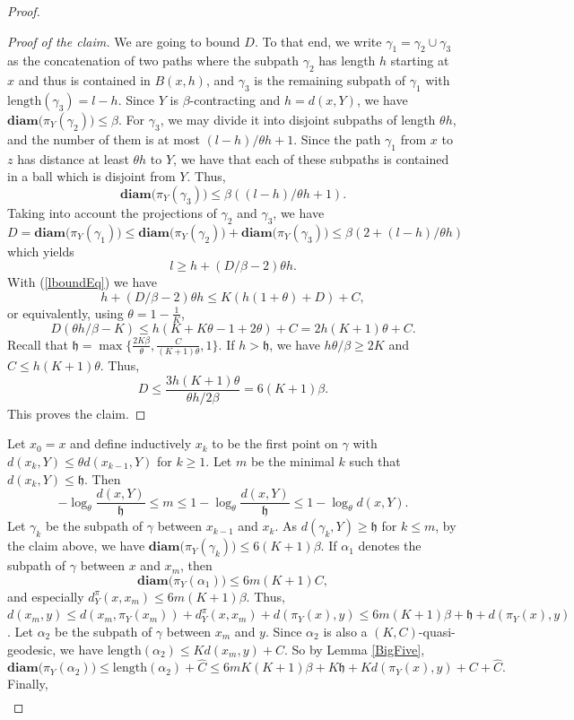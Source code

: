 \documentclass{amsart}
\numberwithin{thm}{section}
\numberwithin{figure}{section}
\theoremstyle{definition}
\theoremstyle{definition}
\theoremstyle{remark}
\newcommand{\diam }[1]{{\textbf{diam}\big(#1\big)}}
\numberwithin{equation}{section}
\theoremstyle{plain}
\begin{document}
\begin{proof}
\begin{proof}[Proof of the claim]
		We are going to bound $D$. To that end,  we write $\gamma_1 = \gamma_2 \cup \gamma_3$ as the concatenation of two paths where  the subpath $\gamma_2$ has length $h$ starting at $x$ and thus is contained in $B(x, h)$, and $\gamma_3$ is the remaining subpath of $\gamma_1$ with $\mathrm{length}(\gamma_3) = l - h$. Since $Y$ is $\beta$-contracting and $h = d(x, Y)$, we have $\diam{\pi_Y(\gamma_2)} \le \beta$. For $\gamma_3$, we may divide it into disjoint subpaths of length $\theta h$, and the number of them is at most $({l-h})/{\theta h} + 1.$ Since the path $\gamma_1$ from $x$ to $z$ has distance at least $\theta h$ to $Y$, we have that each of these subpaths is contained in a ball which is disjoint from $Y$. Thus, $$\diam{\pi_Y(\gamma_3)}\le \beta\left({(l-h)}/{\theta h} + 1\right).$$ Taking into account the projections  of $\gamma_2$ and $\gamma_3$, we have $$D = \diam{\pi_Y(\gamma_1)} \le \diam{\pi_Y(\gamma_2)} + \diam{\pi_Y(\gamma_3)} \le \beta \left(2 + {(l-h)}/{\theta h}\right)$$
		which yields $$l \ge h + \left({D}/{\beta} - 2\right)\theta h.$$
		With (\ref{lboundEq}) we have $$h + \left({D}/{\beta} - 2\right) \theta h \le K\left(h(1+\theta) + D\right) + C,$$ or equivalently, using  $\theta=1-\frac{1}{K}$, $$D\left( {\theta h}/{\beta} - K\right)  \le h\left(K +K\theta- 1+2\theta \right) + C =  2h(K +1 )\theta + C.$$ Recall that   $\mathfrak h= \max\{\frac{2K\beta}{\theta}, \frac{C}{(K+1)\theta}, 1\}$. If $h > \mathfrak h$, we have ${h\theta }/{\beta} \ge 2K$ and $C\le h (K +1) \theta$. Thus, $$D \le \frac{3h(K +1)\theta}{{\theta h}/{2\beta}} = 6(K + 1)\beta.$$
		This proves the claim.
	\end{proof}
	Let $x_0 = x$ and define inductively $x_k$ to be the first point on $\gamma$ with $d(x_k, Y) \le \theta d(x_{k-1}, Y)$ for $k\ge 1$. Let $m$ be the minimal $k$ such that $d(x_k, Y)\le \mathfrak h$. Then $$-{\log_{\theta} \frac{d(x,Y)}{\mathfrak h}} \le m \le 1- {\log_\theta \frac{d(x,Y)}{\mathfrak h}} \le 1 - \log_\theta d(x,Y).$$  
	Let $\gamma_k$ be the subpath of $\gamma$ between $x_{k-1}$ and $x_k$. As    $d(\gamma_{k}, Y)\ge \mathfrak h$ for $k\le m$, by the claim above, we have $\diam{\pi_Y(\gamma_k)}\le 6(K+1) \beta$. If $\alpha_1$ denotes the subpath of $\gamma$ between $x$ and $x_m$, then $$\diam{\pi_Y(\alpha_1)} \le 6m(K+1) C,$$ and especially $d_Y^\pi(x, x_m) \le 6m(K+1) \beta$. Thus, $d(x_m, y)\le d(x_m, \pi_Y(x_m)) + d_Y^\pi(x, x_m) + d(\pi_Y(x), y) \le 6m(K+1)\beta + \mathfrak h + d(\pi_Y(x), y)$. Let $\alpha_2$ be the subpath of $\gamma$ between $x_m$ and $y$. Since $\alpha_2$ is also a $(K, C)$-quasi-geodesic, we have $\mathrm{length}(\alpha_2)\le K d(x_m, y) + C$. So by Lemma \ref{BigFive}, $$\diam{\pi_Y(\alpha_2)} \le \mathrm{length}(\alpha_2) + \hat C \le 6m K(K+1) \beta + K \mathfrak h + K d(\pi_Y(x), y) + C + \hat C.$$ Finally, $$\begin{aligned}

\end{aligned}$$
\end{proof}
\end{document}
